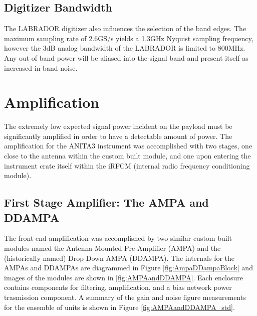 	\subsection{Digitizer Bandwidth}
		The LABRADOR digitizer also influences the selection of the band edges.  The maximum sampling rate of 2.6GS/s yields a 1.3GHz Nyquist sampling frequency, however the 3dB analog bandwidth of the LABRADOR is limited to 800MHz\cite{LABASICPAPER}.  Any out of band power will be aliased into the signal band and present itself as increased in-band noise\cite{NyquistSampling}. 
		
\section{Amplification}
	The extremely low expected signal power incident on the payload must be significantly amplified in order to have a detectable amount of power.  The amplification for the ANITA3 instrument was accomplished with two stages, one close to the antenna within the custom built module, and one upon entering the instrument crate itself within the iRFCM (internal radio frequency conditioning module).  
	
	\subsection{First Stage Amplifier: The AMPA and DDAMPA}
		The front end amplification was accomplished by two similar custom built modules named the Antenna Mounted Pre-Amplifier (AMPA) and the (historically named) Drop Down AMPA (DDAMPA).  The internals for the AMPAs and DDAMPAs are diagrammed in Figure \ref{fig:AmpaDDampaBlock} and images of the modules are shown in \ref{fig:AMPAandDDAMPA}. Each enclosure contains components for filtering, amplification, and a bias network power trasmission component.  A summary of the gain and noise figure measurements for the ensemble of units is shown in Figure \ref{fig:AMPAandDDAMPA_std}.
		
